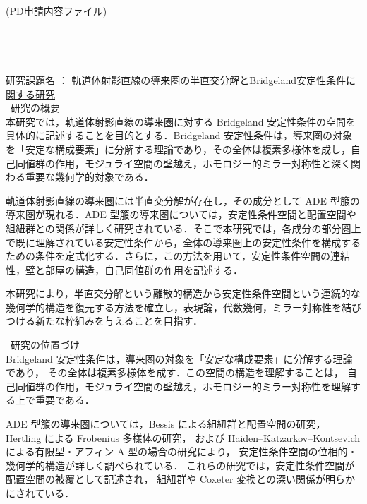 \documentclass[leqno]{ltjsarticle}
\begin{document}
\hfill (PD申請内容ファイル)\\
\\ \\
\\ \\
\underline{研究課題名 ： 軌道体射影直線の導来圏の半直交分解とBridgeland安定性条件に関する研究}
\\
\bullet\  研究の概要\\
本研究では，軌道体射影直線の導来圏に対する Bridgeland 安定性条件の空間を具体的に記述することを目的とする．Bridgeland 安定性条件は，導来圏の対象を「安定な構成要素」に分解する理論であり，その全体は複素多様体を成し，自己同値群の作用，モジュライ空間の壁越え，ホモロジー的ミラー対称性と深く関わる重要な幾何学的対象である．

軌道体射影直線の導来圏には半直交分解が存在し，その成分として ADE 型箙の導来圏が現れる．ADE 型箙の導来圏については，安定性条件空間と配置空間や組紐群との関係が詳しく研究されている．そこで本研究では，各成分の部分圏上で既に理解されている安定性条件から，全体の導来圏上の安定性条件を構成するための条件を定式化する．さらに，この方法を用いて，安定性条件空間の連結性，壁と部屋の構造，自己同値群の作用を記述する．

本研究により，半直交分解という離散的構造から安定性条件空間という連続的な幾何学的構造を復元する方法を確立し，表現論，代数幾何，ミラー対称性を結びつける新たな枠組みを与えることを目指す．

\vspace{2mm}

\bullet\ 研究の位置づけ\\
Bridgeland 安定性条件は，導来圏の対象を「安定な構成要素」に分解する理論であり，
その全体は複素多様体を成す．この空間の構造を理解することは，
自己同値群の作用，モジュライ空間の壁越え，ホモロジー的ミラー対称性を理解する上で重要である．

ADE 型箙の導来圏については，Bessis による組紐群と配置空間の研究，
Hertling による Frobenius 多様体の研究，
および Haiden--Katzarkov--Kontsevich による有限型・アフィン A 型の場合の研究により，
安定性条件空間の位相的・幾何学的構造が詳しく調べられている．
これらの研究では，安定性条件空間が配置空間の被覆として記述され，
組紐群や Coxeter 変換との深い関係が明らかにされている．
\end{document}

